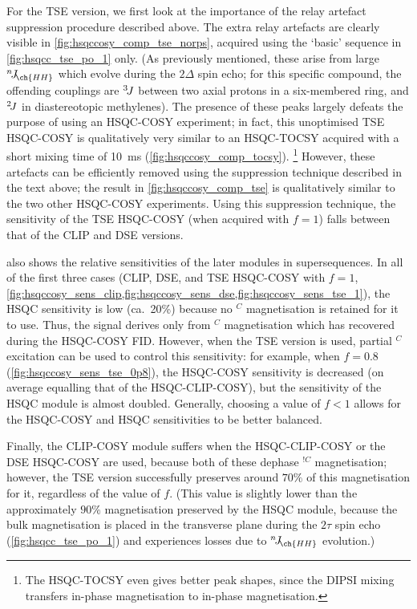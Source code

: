 \documentclass[a4paper,12pt]{article}
\newcommand{\magn}[1]{\ch{^1H}$^{#1}$}
\newcommand{\magnnot}[1]{\ch{^1H}$^{!#1}$}
\newcommand{\nJ}[1]{{}^{n}\!J_{\!\ch{#1}}}
\begin{document}
\begin{refsection}
For the TSE version, we first look at the importance of the relay artefact suppression procedure described above.
The extra relay artefacts are clearly visible in \cref{fig:hsqccosy_comp_tse_norps}, acquired using the `basic' sequence in \cref{fig:hsqcc_tse_po_1} only.
(As previously mentioned, these arise from large $\nJ{HH}$ which evolve during the $2\Delta$ spin echo; for this specific compound, the offending couplings are $^3\!J\/$ between two axial protons in a six-membered ring, and $^2\!J\/$ in diastereotopic methylenes).
The presence of these peaks largely defeats the purpose of using an HSQC-COSY experiment; in fact, this unoptimised TSE HSQC-COSY is qualitatively very similar to an HSQC-TOCSY acquired with a short mixing time of \qty{10}{\ms} (\cref{fig:hsqccosy_comp_tocsy}).%
\footnote{The HSQC-TOCSY even gives better peak shapes, since the DIPSI mixing transfers in-phase magnetisation to in-phase magnetisation.}
However, these artefacts can be efficiently removed using the suppression technique described in the text above; the result in \cref{fig:hsqccosy_comp_tse} is qualitatively similar to the two other HSQC-COSY experiments.
Using this suppression technique, the sensitivity of the TSE HSQC-COSY (when acquired with $f = 1$) falls between that of the CLIP and DSE versions.

 also shows the relative sensitivities of the later modules in  supersequences.
In all of the first three cases (CLIP, DSE, and TSE HSQC-COSY with $f = 1$, \cref{fig:hsqccosy_sens_clip,fig:hsqccosy_sens_dse,fig:hsqccosy_sens_tse_1}), the HSQC sensitivity is low (ca.\ 20\%) because no \magn{C} magnetisation is retained for it to use.
Thus, the signal derives only from \magn{C} magnetisation which has recovered during the HSQC-COSY FID.
However, when the TSE version is used, partial \magn{C} excitation can be used to control this sensitivity: for example, when $f = 0.8$ (\cref{fig:hsqccosy_sens_tse_0p8}), the HSQC-COSY sensitivity is decreased (on average equalling that of the HSQC-CLIP-COSY), but the sensitivity of the HSQC module is almost doubled.
Generally, choosing a value of $f < 1$ allows for the HSQC-COSY and HSQC sensitivities to be better balanced.

Finally, the CLIP-COSY module suffers when the HSQC-CLIP-COSY or the DSE HSQC-COSY are used, because both of these dephase \magnnot{C} magnetisation;
however, the TSE version successfully preserves around $70\%$ of this magnetisation for it, regardless of the value of $f$.
(This value is slightly lower than the approximately $90\%$ magnetisation preserved by the HSQC module, because the bulk magnetisation is placed in the transverse plane during the $2\tau$ spin echo (\cref{fig:hsqcc_tse_po_1}) and experiences losses due to $\nJ{HH}$ evolution.)



\end{refsection}
\end{document}
